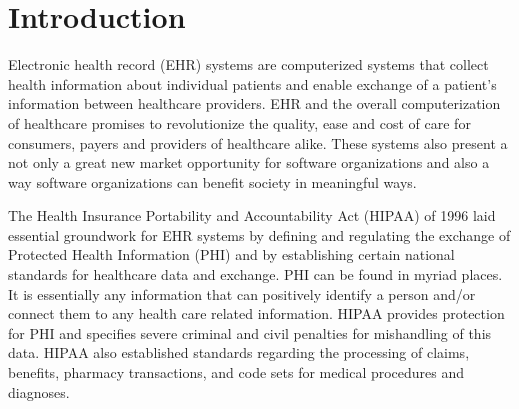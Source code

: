 \documentclass[10pt]{article}
\begin{document}





\section{Introduction}
\label{sec:Introduction}

Electronic health record (EHR) systems are computerized systems that collect health information about individual patients 
and enable exchange of a patient's information between healthcare providers.
EHR and the overall computerization of healthcare promises to revolutionize the quality, ease and cost of care for consumers, payers and providers of healthcare alike.
These systems also present a not only a great new market opportunity for software organizations and also a way software organizations can benefit society in meaningful ways.


The Health Insurance Portability and Accountability Act (HIPAA) of 1996 laid essential groundwork for EHR systems by defining and regulating the exchange of Protected Health Information (PHI) and by establishing certain national standards for healthcare data and exchange.
PHI can be found in myriad places. 
It is essentially any information that can positively identify a person and/or connect them to any health care related information.
HIPAA provides protection for PHI and specifies severe criminal and civil penalties for mishandling of this data.
HIPAA also established standards regarding the processing of claims, benefits, pharmacy transactions, and code sets for medical procedures and diagnoses. 
\cite{ehrbook}
\end{document}
